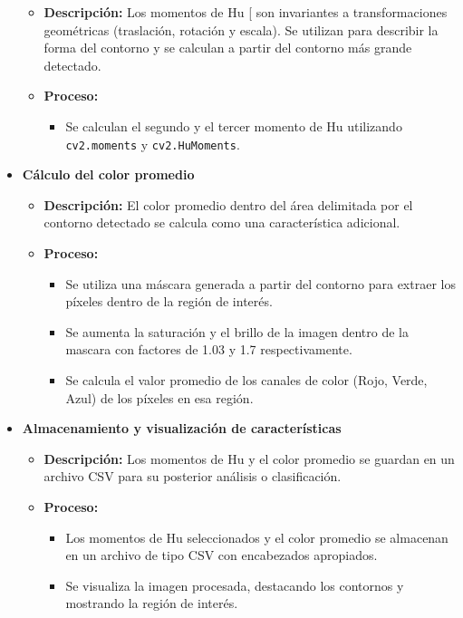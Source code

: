 \documentclass[12pt,a4paper]{article}
\begin{document}
\begin{itemize}
\begin{itemize}
        \item \textbf{Descripción:} Los momentos de Hu [\cite{wikipedia_image_moment} son invariantes a transformaciones geométricas (traslación, rotación y escala). Se utilizan para describir la forma del contorno y se calculan a partir del contorno más grande detectado.
        \item \textbf{Proceso:} 
        \begin{itemize}
            \item Se calculan el segundo y el tercer momento de Hu utilizando \texttt{cv2.moments} y \texttt{cv2.HuMoments}.
        \end{itemize}
    \end{itemize}

    \item \textbf{Cálculo del color promedio}
    \begin{itemize}
        \item \textbf{Descripción:} El color promedio dentro del área delimitada por el contorno detectado se calcula como una característica adicional.
        \item \textbf{Proceso:} 
        \begin{itemize}
            \item Se utiliza una máscara generada a partir del contorno para extraer los píxeles dentro de la región de interés.
            \item Se aumenta la saturación y el brillo de la imagen dentro de la mascara con factores de 1.03 y 1.7 respectivamente.
            \item Se calcula el valor promedio de los canales de color (Rojo, Verde, Azul) de los píxeles en esa región.
        \end{itemize}
    \end{itemize}

    \item \textbf{Almacenamiento y visualización de características}
    \begin{itemize}
        \item \textbf{Descripción:} Los momentos de Hu y el color promedio se guardan en un archivo CSV para su posterior análisis o clasificación.
        \item \textbf{Proceso:} 
        \begin{itemize}
            \item Los momentos de Hu seleccionados y el color promedio se almacenan en un archivo de tipo CSV con encabezados apropiados.
            \item Se visualiza la imagen procesada, destacando los contornos y mostrando la región de interés.
        \end{itemize}
\end{itemize}
\end{itemize}
\end{document}
